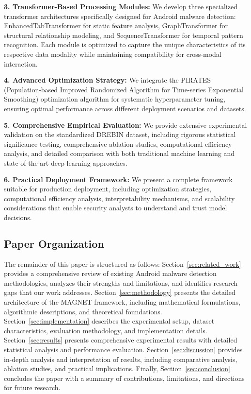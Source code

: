 \documentclass[a4paper,11pt]{article}
\begin{document}
\textbf{3. Transformer-Based Processing Modules:} We develop three specialized transformer architectures specifically designed for Android malware detection: EnhancedTabTransformer for static feature analysis, GraphTransformer for structural relationship modeling, and SequenceTransformer for temporal pattern recognition. Each module is optimized to capture the unique characteristics of its respective data modality while maintaining compatibility for cross-modal interaction.

\textbf{4. Advanced Optimization Strategy:} We integrate the PIRATES (Population-based Improved Randomized Algorithm for Time-series Exponential Smoothing) optimization algorithm for systematic hyperparameter tuning, ensuring optimal performance across different deployment scenarios and datasets.

\textbf{5. Comprehensive Empirical Evaluation:} We provide extensive experimental validation on the standardized DREBIN dataset, including rigorous statistical significance testing, comprehensive ablation studies, computational efficiency analysis, and detailed comparison with both traditional machine learning and state-of-the-art deep learning approaches.

\textbf{6. Practical Deployment Framework:} We present a complete framework suitable for production deployment, including optimization strategies, computational efficiency analysis, interpretability mechanisms, and scalability considerations that enable security analysts to understand and trust model decisions.

\subsection{Paper Organization}

The remainder of this paper is structured as follows: Section~\ref{sec:related_work} provides a comprehensive review of existing Android malware detection methodologies, analyzes their strengths and limitations, and identifies research gaps that our work addresses. Section~\ref{sec:methodology} presents the detailed architecture of the MAGNET framework, including mathematical formulations, algorithmic descriptions, and theoretical foundations. Section~\ref{sec:implementation} describes the experimental setup, dataset characteristics, evaluation methodology, and implementation details. Section~\ref{sec:results} presents comprehensive experimental results with detailed statistical analysis and performance evaluation. Section~\ref{sec:discussion} provides in-depth analysis and interpretation of results, including comparative analysis, ablation studies, and practical implications. Finally, Section~\ref{sec:conclusion} concludes the paper with a summary of contributions, limitations, and directions for future research.
\end{document}
